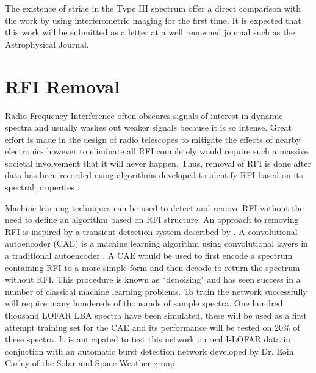 The existence of striae in the Type III spectrum offer a direct comparison with the work by \cite{Kontar2017} using interferometric imaging for the first time. It is expected that this work will be submitted as a letter at a well renowned journal such as the Astrophysical Journal.

\section{RFI Removal}
Radio Frequency Interference often obscures signals of interest in dynamic spectra and usually washes out weaker signals because it is so intense. Great effort is made in the design of radio telescopes to mitigate the effects of nearby electronics however to eliminate all RFI completely would require such a massive societal involvement that it will never happen. Thus, removal of RFI is done after data has been recorded using algorithms developed to identify RFI based on its spectral properties \citep{Offringa2012b, Nita2007}.

Machine learning techniques can be used to detect and remove RFI without the need to define an algorithm based on RFI structure. An approach to removing RFI is inspired by a transient detection system described by \cite{Sedaghat2018}. A convolutional autoencoder (CAE) is a machine learning algorithm using convolutional layers in a traditional autoencoder \citep{Vincent2008}. A CAE would be used to first encode a spectrum containing RFI to a more simple form and then decode to return the spectrum without RFI. This procedure is known as ``denoising" and has seen success in a number of classical machine learning problems. To train the network successfully will require many hundereds of thousands of sample spectra. One hundred thousand LOFAR LBA spectra have been simulated, these will be used as a first attempt training set for the CAE and its performance will be tested on 20\% of these spectra. It is anticipated to test this network on real I-LOFAR data in conjuction with an automatic burst detection network developed by Dr. Eoin Carley of the Solar and Space Weather group.


